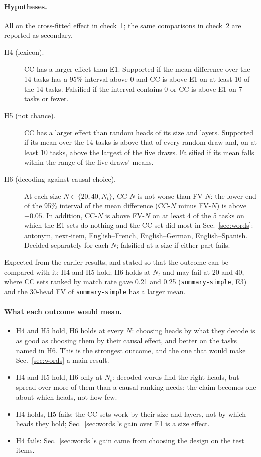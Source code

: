 \documentclass[11pt,a4paper]{article}
\begin{document}
\paragraph{Hypotheses.} All on the cross-fitted effect in check~1; the same comparisons in
check~2 are reported as secondary.
\begin{description}
  \item[H4 (lexicon).] CC has a larger effect than E1. Supported if the mean difference over
    the 14 tasks has a 95\% interval above 0 and CC is above E1 on at least 10 of the 14 tasks.
    Falsified if the interval contains 0 or CC is above E1 on 7 tasks or fewer.
  \item[H5 (not chance).] CC has a larger effect than random heads of its size and layers.
    Supported if its mean over the 14 tasks is above that of every random draw and, on at
    least 10 tasks, above the largest of the five draws. Falsified if its mean falls within the
    range of the five draws' means.
  \item[H6 (decoding against causal choice).] At each size $N \in \{20, 40, N_t\}$, CC-$N$
    is not worse than FV-$N$: the lower end of the 95\% interval of the mean difference
    (CC-$N$ minus FV-$N$) is above $-0.05$. In addition, CC-$N$ is above FV-$N$ on at least
    4 of the 5 tasks on which the E1 sets do nothing and the CC set did most in Sec.~\ref{sec:words}:
    antonym, next-item, English--French, English--German, English--Spanish. Decided
    separately for each $N$; falsified at a size if either part fails.
\end{description}
Expected from the earlier results, and stated so that the outcome can be compared with it:
H4 and H5 hold; H6 holds at $N_t$ and may fail at 20 and 40, where CC sets ranked by match
rate gave 0.21 and 0.25 (\texttt{summary-simple}, E3) and the 30-head FV of \texttt{summary-simple} has a larger mean.

\paragraph{What each outcome would mean.}
\begin{itemize}
  \item H4 and H5 hold, H6 holds at every $N$: choosing heads by what they decode is as
    good as choosing them by their causal effect, and better on the tasks named in H6. This
    is the strongest outcome, and the one that would make Sec.~\ref{sec:words} a main result.
  \item H4 and H5 hold, H6 only at $N_t$: decoded words find the right heads, but spread
    over more of them than a causal ranking needs; the claim becomes one about which heads,
    not how few.
  \item H4 holds, H5 fails: the CC sets work by their size and layers, not by which heads
    they hold; Sec.~\ref{sec:words}'s gain over E1 is a size effect.
  \item H4 fails: Sec.~\ref{sec:words}'s gain came from choosing the design on the test items.
\end{itemize}
\end{document}
